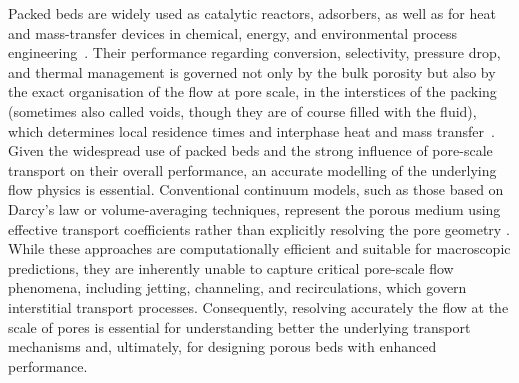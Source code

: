 Packed beds are widely used as catalytic reactors, adsorbers, as well as for heat and mass-transfer devices in chemical, energy, and environmental process engineering~\cite{Dixon,Aglave}. Their performance regarding conversion, selectivity, pressure drop, and thermal management is governed not only by the bulk porosity but also by the exact organisation of the flow at pore scale, in the interstices of the packing (sometimes also called voids, though they are of course filled with the fluid), which determines local residence times and interphase heat and mass transfer~\cite{Augier,freund2003numerical}. Given the widespread use of packed beds and the strong influence of pore-scale transport on their overall performance, an accurate modelling of the underlying flow physics is essential. Conventional continuum models, such as those based on Darcy's law or volume-averaging techniques, represent the porous medium using effective transport coefficients rather than explicitly resolving the pore geometry \cite{Zhisong}. While these approaches are computationally efficient and suitable for macroscopic predictions, they are inherently unable to capture critical pore-scale flow phenomena, including jetting, channeling, and recirculations, which govern interstitial transport processes. Consequently, resolving accurately the flow at the scale of pores is essential for understanding better the underlying transport mechanisms and, ultimately, for designing porous beds with enhanced performance.

